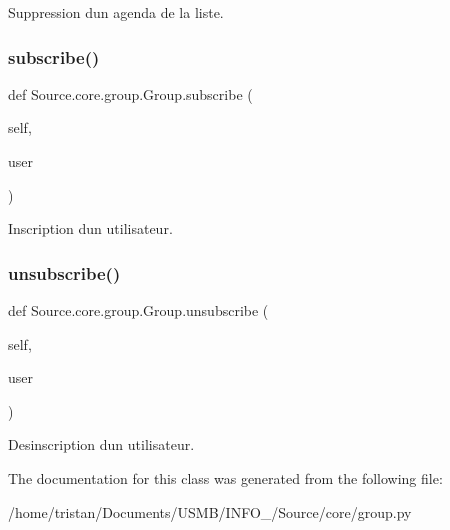 Suppression d\textquotesingle{}un agenda de la liste. 

\mbox{\label{classSource_1_1core_1_1group_1_1Group_a92e2cdd12d4220411d1e6990efe46ab4}} 
\subsubsection{\texorpdfstring{subscribe()}{subscribe()}}
{\footnotesize\ttfamily def Source.\+core.\+group.\+Group.\+subscribe (\begin{DoxyParamCaption}\item[{}]{self,  }\item[{}]{user }\end{DoxyParamCaption})}



Inscription d\textquotesingle{}un utilisateur. 

\mbox{\label{classSource_1_1core_1_1group_1_1Group_a0ceabbe4c3cadd23a63628c8aa08023f}} 
\subsubsection{\texorpdfstring{unsubscribe()}{unsubscribe()}}
{\footnotesize\ttfamily def Source.\+core.\+group.\+Group.\+unsubscribe (\begin{DoxyParamCaption}\item[{}]{self,  }\item[{}]{user }\end{DoxyParamCaption})}



Desinscription d\textquotesingle{}un utilisateur. 



The documentation for this class was generated from the following file\+:\begin{DoxyCompactItemize}
\item 
/home/tristan/\+Documents/\+U\+S\+M\+B/\+I\+N\+F\+O\+\_/\+Source/core/group.\+py\end{DoxyCompactItemize}
